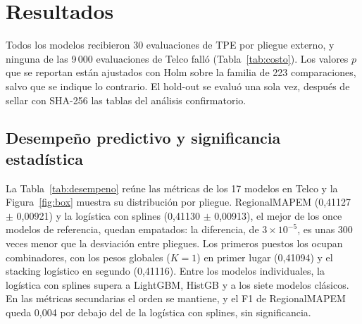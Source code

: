 \documentclass[11pt,a4paper]{article}
\begin{document}
\section{Resultados}\label{sec:results}

Todos los modelos recibieron 30 evaluaciones de TPE por pliegue externo, y ninguna de las 9\,000 evaluaciones de Telco falló (Tabla~\ref{tab:costo}). Los valores $p$ que se reportan están ajustados con Holm sobre la familia de 223 comparaciones, salvo que se indique lo contrario. El hold-out se evaluó una sola vez, después de sellar con SHA-256 las tablas del análisis confirmatorio.

\subsection{Desempeño predictivo y significancia estadística}
La Tabla~\ref{tab:desempeno} reúne las métricas de los 17 modelos en Telco y la Figura~\ref{fig:box} muestra su distribución por pliegue. RegionalMAPEM (0,41127 $\pm$ 0,00921) y la logística con splines (0,41130 $\pm$ 0,00913), el mejor de los once modelos de referencia, quedan empatados: la diferencia, de $3\times10^{-5}$, es unas 300 veces menor que la desviación entre pliegues. Los primeros puestos los ocupan combinadores, con los pesos globales ($K=1$) en primer lugar (0,41094) y el stacking logístico en segundo (0,41116). Entre los modelos individuales, la logística con splines supera a LightGBM, HistGB y a los siete modelos clásicos. En las métricas secundarias el orden se mantiene, y el F1 de RegionalMAPEM queda 0,004 por debajo del de la logística con splines, sin significancia.
\end{document}

